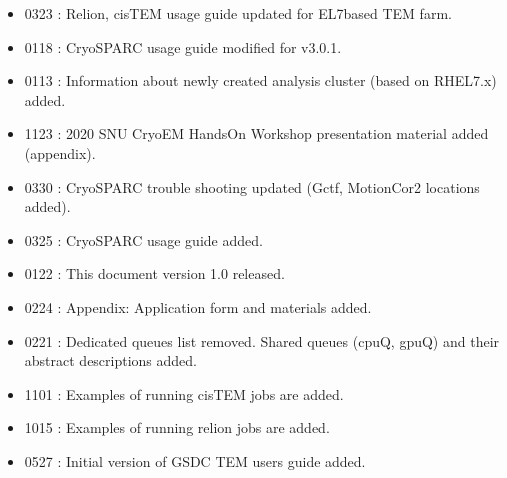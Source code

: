 \documentclass[a4paper,11pt,english]{sphinxmanual}
\begin{document}
\begin{itemize}
\item {} 
\sphinxhyphen{}03\sphinxhyphen{}23 : Relion, cisTEM usage guide updated for EL7\sphinxhyphen{}based TEM farm.

\item {} 
\sphinxhyphen{}01\sphinxhyphen{}18 : CryoSPARC usage guide modified for v3.0.1.

\item {} 
\sphinxhyphen{}01\sphinxhyphen{}13 : Information about newly created analysis cluster (based on RHEL7.x) added.

\item {} 
\sphinxhyphen{}11\sphinxhyphen{}23 : 2020 SNU CryoEM Hands\sphinxhyphen{}On Workshop presentation material added (appendix).

\item {} 
\sphinxhyphen{}03\sphinxhyphen{}30 : CryoSPARC trouble shooting updated (Gctf, MotionCor2 locations added).

\item {} 
\sphinxhyphen{}03\sphinxhyphen{}25 : CryoSPARC usage guide added.

\item {} 
\sphinxhyphen{}01\sphinxhyphen{}22 : This document version 1.0 released.

\item {} 
\sphinxhyphen{}02\sphinxhyphen{}24 : Appendix: Application form and materials added.

\item {} 
\sphinxhyphen{}02\sphinxhyphen{}21 : Dedicated queues list removed. Shared queues (cpuQ, gpuQ) and their abstract descriptions added.

\item {} 
\sphinxhyphen{}11\sphinxhyphen{}01 : Examples of running cisTEM jobs are added.

\item {} 
\sphinxhyphen{}10\sphinxhyphen{}15 : Examples of running relion jobs are added.

\item {} 
\sphinxhyphen{}05\sphinxhyphen{}27 : Initial version of GSDC TEM users guide added.

\end{itemize}

\sphinxstepscope
\end{document}
